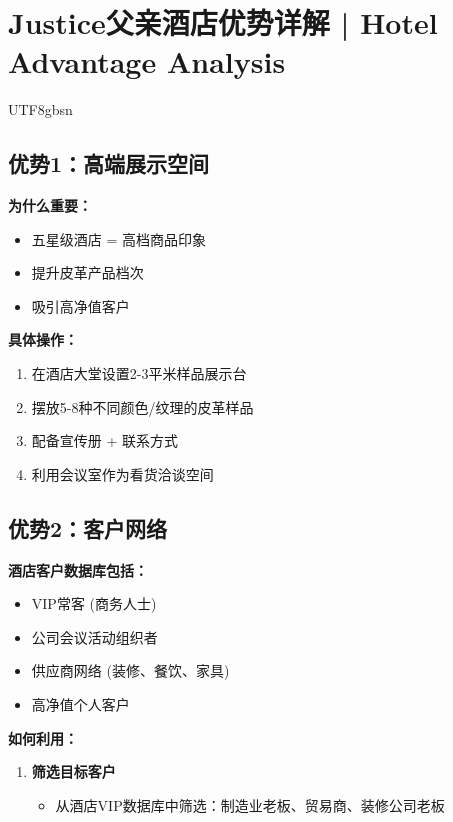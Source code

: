 \documentclass[12pt,a4paper]{article}
\begin{document}
\newpage

\section{Justice父亲酒店优势详解 | Hotel Advantage Analysis}

\begin{CJK}{UTF8}{gbsn}

\subsection{优势1：高端展示空间}

\textbf{为什么重要：}
\begin{itemize}
    \item 五星级酒店 = 高档商品印象
    \item 提升皮革产品档次
    \item 吸引高净值客户
\end{itemize}

\textbf{具体操作：}
\begin{enumerate}
    \item 在酒店大堂设置2-3平米样品展示台
    \item 摆放5-8种不同颜色/纹理的皮革样品
    \item 配备宣传册 + 联系方式
    \item 利用会议室作为看货洽谈空间
\end{enumerate}

\subsection{优势2：客户网络}

\textbf{酒店客户数据库包括：}
\begin{itemize}
    \item VIP常客 (商务人士)
    \item 公司会议活动组织者
    \item 供应商网络 (装修、餐饮、家具)
    \item 高净值个人客户
\end{itemize}

\textbf{如何利用：}
\begin{enumerate}
    \item \textbf{筛选目标客户}
    \begin{itemize}
        \item 从酒店VIP数据库中筛选：制造业老板、贸易商、装修公司老板
    \end{itemize}
    

\end{enumerate}
\end{CJK}
\end{document}
